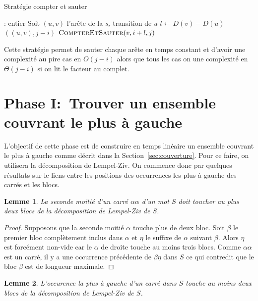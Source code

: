 \documentclass[10pt,letterpaper,oneside]{article}
\newtheorem{lemme}{Lemme}
\begin{document}
\begin{algorithm}[htb]
    \caption{Stratégie compter et sauter}
    \label{alg:coutn&skip}
    \begin{algorithmic}[1]
        : entier
            \State Soit $(u,v)$ l'arête de la $s_i$-transition de $u$
            \State $l\gets D(v)-D(u)$
                \State \Return $((u,v),j-i)$
            \EndIf
            \State \Return $\Call{CompterEtSauter}{v,i+l,j}$
        \EndFunction
    \end{algorithmic}
\end{algorithm}

Cette stratégie permet de sauter chaque arête en temps constant et d'avoir une complexité au pire cas en $O(j-i)$ alors que tous les cas on une complexité en $\Theta(j-i)$ si on lit le facteur au complet.

\section{Phase I:~Trouver un ensemble couvrant le plus à gauche}

L'objectif de cette phase est de construire en temps linéaire un ensemble couvrant le plus à gauche comme décrit dans la Section~\ref{sec:couverture}. Pour ce faire, on utilisera la décomposition de Lempel-Ziv. On commence donc par quelques résultats sur  le liens entre les positions des occurrences les plus à gauche des carrés et les blocs.

\begin{lemme} \label{lem:seconde_moitie}
    La seconde moitié d'un carré $\alpha\alpha$ d'un mot $S$ doit toucher au plus deux blocs de la décomposition de Lempel-Ziv de $S$.
\end{lemme}

\begin{proof}
    Supposons que la seconde moitié $\alpha$ touche plus de deux bloc. Soit $\beta$ le premier bloc complètement inclus dans $\alpha$ et $\eta$ le suffixe de $\alpha$ suivant $\beta$. Alors $\eta$ est forcément non-vide car le $\alpha$ de droite touche au moins trois blocs. Comme $\alpha\alpha$ est un carré, il y a une occurrence précédente de $\beta\eta$ dans $S$  ce qui contredit que le bloc $\beta$ est de longueur maximale.
\end{proof}

\begin{lemme} \label{lem:touche2}
    L'occurence la plus à gauche d'un carré dans $S$ touche au moins deux blocs de la décomposition de Lempel-Ziv de $S$.
\end{lemme}
\end{document}
